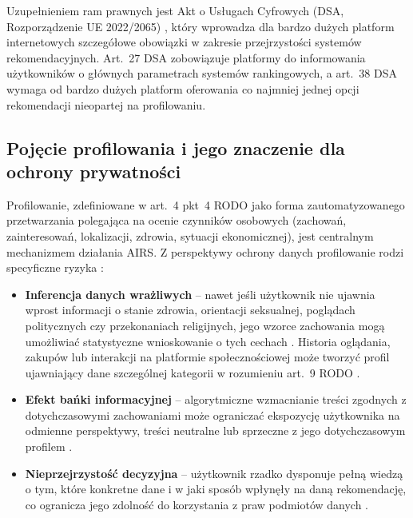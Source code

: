 \documentclass[12pt, a4paper]{article}
\begin{document}
Uzupełnieniem ram prawnych jest Akt o Usługach Cyfrowych (DSA, Rozporządzenie UE 2022/2065) \cite{dsa}, który wprowadza dla bardzo dużych platform internetowych szczegółowe obowiązki w zakresie przejrzystości systemów rekomendacyjnych. Art.~27 DSA \cite{dsa} zobowiązuje platformy do informowania użytkowników o głównych parametrach systemów rankingowych, a art.~38 DSA \cite{dsa} wymaga od bardzo dużych platform oferowania co najmniej jednej opcji rekomendacji nieopartej na profilowaniu.

\subsection{Pojęcie profilowania i jego znaczenie dla ochrony prywatności}

Profilowanie, zdefiniowane w art.~4 pkt~4 RODO \cite{rodo} jako forma zautomatyzowanego przetwarzania polegająca na ocenie czynników osobowych (zachowań, zainteresowań, lokalizacji, zdrowia, sytuacji ekonomicznej), jest centralnym mechanizmem działania AIRS. Z perspektywy ochrony danych profilowanie rodzi specyficzne ryzyka \cite{himeur2022, chen2025}:

\begin{itemize}
  \item \textbf{Inferencja danych wrażliwych} -- nawet jeśli użytkownik nie ujawnia wprost informacji o stanie zdrowia, orientacji seksualnej, poglądach politycznych czy przekonaniach religijnych, jego wzorce zachowania mogą umożliwiać statystyczne wnioskowanie o tych cechach \cite{himeur2022}. Historia oglądania, zakupów lub interakcji na platformie społecznościowej może tworzyć profil ujawniający dane szczególnej kategorii w rozumieniu art.~9 RODO \cite{rodo}.
  \item \textbf{Efekt bańki informacyjnej} -- algorytmiczne wzmacnianie treści zgodnych z dotychczasowymi zachowaniami może ograniczać ekspozycję użytkownika na odmienne perspektywy, treści neutralne lub sprzeczne z jego dotychczasowym profilem \cite{ig_ranking}.
  \item \textbf{Nieprzejrzystość decyzyjna} -- użytkownik rzadko dysponuje pełną wiedzą o tym, które konkretne dane i w jaki sposób wpłynęły na daną rekomendację, co ogranicza jego zdolność do korzystania z praw podmiotów danych \cite{chen2025, edpb2019}.
\end{itemize}

\newpage
\end{document}

